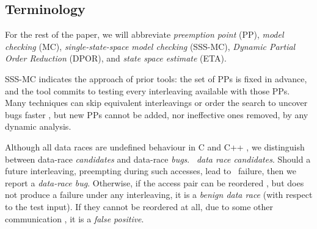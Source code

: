 
\subsection{Terminology}

For the rest of the paper, we will abbreviate {\em preemption point} (PP),
{\em model checking} (MC),
{\em single-state-space model checking} (SSS-MC), %
{\em Dynamic Partial Order Reduction} (DPOR), and {\em state space estimate} (ETA).

SSS-MC indicates the approach of prior tools:
the set of PPs is fixed in advance, and the tool commits to testing every interleaving available with those PPs.
Many techniques can skip equivalent interleavings or order the search to uncover bugs faster \cite{dpor,demeter,chess-icb,gambit,smc-empirical-study},
but new PPs cannot be added, nor ineffective ones removed, by any dynamic analysis.

Although all data races are undefined behaviour in C and C++ \cite{boehm-memorymodels},
we distinguish between data-race {\em candidates} and data-race {\em bugs}.
~{\em data race candidates}.
Should a future interleaving, preempting during such accesses,
lead to ~failure, then we report a {\em data-race bug}.
Otherwise, if the access pair can be reordered , but does not produce a failure under any interleaving, it is a {\em benign data race} (with respect to the test input).
If they cannot be reordered at all, due to some other communication , it is a {\em false positive}.

